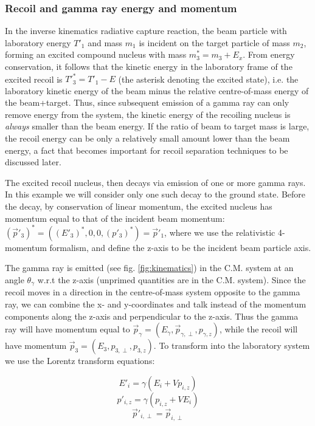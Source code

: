 \subsubsection{Recoil and gamma ray energy and momentum}

In the inverse kinematics radiative capture reaction, the beam particle with laboratory energy $T'_{1}$ and mass $m_{1}$ is incident on the target particle of mass $m_{2}$, forming an excited compound nucleus with mass $m^{*}_{3}=m_{3}+E_{x}$. From energy conservation, it follows that the kinetic energy in the laboratory frame of the excited recoil is $T'^{*}_{3}=T'_{1}-E$ (the asterisk denoting the excited state), i.e. the laboratory kinetic energy of the beam minus the relative centre-of-mass energy of the beam+target. Thus, since subsequent emission of a gamma ray can only remove energy from the system, the kinetic energy of the recoiling nucleus is {\em always} smaller than the beam energy. If the ratio of beam to target mass is large, the recoil energy can be only a relatively small amount lower than the beam energy, a fact that becomes important for recoil separation techniques to be discussed later. 

The excited recoil nucleus, then decays via emission of one or more gamma rays. In this example we will consider only one such decay to the ground state. Before the decay, by conservation of linear momentum, the excited nucleus has momentum  equal to that of the incident beam momentum: $(\vec{p}'_{3})^{*}=((E'_{3})^{*},0,0,(p'_{3})^{*})=\vec{p}'_{1}$, where we use the relativistic 4-momentum formalism, and define the z-axis to be the incident beam particle axis.  

The gamma ray is emitted (see fig. \ref{fig:kinematics}) in the C.M. system at an angle $\theta_{\gamma}$ w.r.t the z-axis (unprimed quantities are in the C.M. system). Since the recoil moves in a direction in the centre-of-mass system opposite to the gamma ray, we can combine the x- and y-coordinates and talk instead of the momentum components along the z-axis and perpendicular to the z-axis. Thus the gamma ray will have momentum equal to $\vec{p}_{\gamma}=(E_{\gamma},\vec{p}_{\gamma,\perp},p_{\gamma,z})$,  while the recoil will have momentum  $\vec{p}_{3}=(E_{3},p_{3, \perp},p_{3,z})$. To transform into the laboratory system we use the Lorentz transform equations:  

\begin{equation}
E'_{i}=\gamma(E_{i}+Vp_{i,z})
\end{equation}
\begin{equation}
p'_{i,z}=\gamma(p_{i,z}+VE_{i})
\end{equation}
\begin{equation}
\vec{p}'_{i,\perp}=\vec{p}_{i,\perp}
\end{equation}

